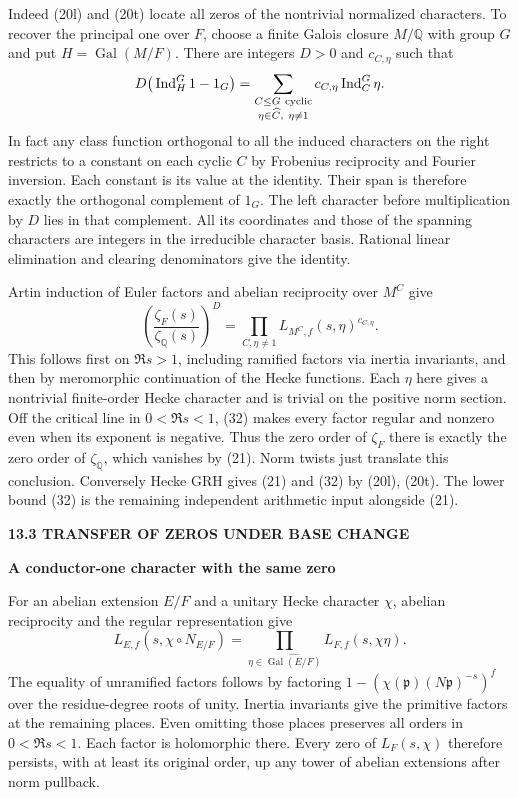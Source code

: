 \documentclass[11pt,letterpaper]{article}
\newcommand{\rightmarktext}{}
\newcommand{\printfolio}{}
\newcommand{\leaf}[4]{\clearpage\gdef\printfolio{#1}\gdef\rightmarktext{#2}%
  {\small\sffamily\bfseries\color{ink}#3\par}\vspace{3pt}%
  {\LARGE\bfseries #4\par}\vspace{5pt}}
\newcommand{\Q}{\mathbb Q}
\begin{document}
Indeed (20l) and (20t) locate all zeros of the nontrivial normalized
characters. To recover the principal one over $F$, choose a finite
Galois closure $M/\Q$ with group $G$ and put $H=\operatorname{Gal}(M/F)$.
There are integers $D>0$ and $c_{C,\eta}$ such that
\[
    D\big(\operatorname{Ind}_H^G1-1_G\big)
       =\sum_{\substack{C\le G\ {\rm cyclic}\\\eta\in\widehat C,\ \eta\ne1}}
                     c_{C,\eta}\operatorname{Ind}_C^G\eta .
\]
In fact any class function orthogonal to all the induced characters on
the right restricts to a constant on each cyclic $C$ by Frobenius
reciprocity and Fourier inversion. Each constant is its value at the
identity. Their span is therefore exactly the orthogonal complement
of $1_G$. The left character before multiplication by $D$ lies in
that complement. All its coordinates and those of the spanning
characters are integers in the irreducible character basis. Rational
linear elimination and clearing denominators give the identity.

Artin induction of Euler factors and abelian reciprocity over $M^C$ give
\[
     \left(\frac{\zeta_F(s)}{\zeta_\Q(s)}\right)^D
         =\prod_{C,\eta\ne1}L_{M^C,f}(s,\eta)^{c_{C,\eta}} .
 \tag{33}
\]
This follows first on $\Re s>1$, including ramified factors via inertia
invariants, and then by meromorphic continuation of the Hecke functions.
Each $\eta$ here gives a nontrivial finite-order Hecke character and
is trivial on the positive norm section. Off the critical line in
$0<\Re s<1$, (32) makes every factor regular and nonzero even when
its exponent is negative. Thus the zero order of $\zeta_F$ there is
exactly the zero order of $\zeta_\Q$, which vanishes by (21).
Norm twists just translate this conclusion. Conversely Hecke GRH gives
(21) and (32) by (20l), (20t). The lower bound (32) is the remaining
independent arithmetic input alongside (21).

\leaf{522j}{Removing finite ramification}{13.3 \quad TRANSFER OF ZEROS UNDER BASE CHANGE}{A conductor-one character with the same zero}
For an abelian extension $E/F$ and a unitary Hecke character $\chi$,
abelian reciprocity and the regular representation give
\[
 L_{E,f}(s,\chi\circ N_{E/F})
      =\prod_{\eta\in\widehat{\operatorname{Gal}(E/F)}}L_{F,f}(s,\chi\eta).
 \tag{34}
\]
The equality of unramified factors follows by factoring
$1-(\chi(\mathfrak p)(N\mathfrak p)^{-s})^f$ over the residue-degree
roots of unity. Inertia invariants give the primitive factors at the
remaining places. Even omitting those places preserves all orders in
$0<\Re s<1$. Each factor is holomorphic there. Every zero of $L_F(s,\chi)$
therefore persists, with at least its original order, up any tower of
abelian extensions after norm pullback.
\end{document}
